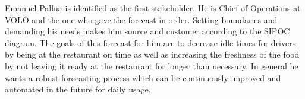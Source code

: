 \begin{table}[h]
\centering
\caption{SIPOC Diagram derived from the five basic steps}
\label{tab:sipoc}
\end{table}
Emanuel Pallua is identified as the first stakeholder. He is Chief of Operations at VOLO and the one who gave the forecast in order. Setting boundaries and demanding his needs makes him source and customer according to the SIPOC diagram. The goals of this forecast for him are to decrease idle times for drivers by being at the restaurant on time as well as increasing the freshness of the food by not leaving it ready at the restaurant for longer than necessary. In general he wants a robust forecasting process which can be continuously improved and automated in the future for daily usage. \newline
